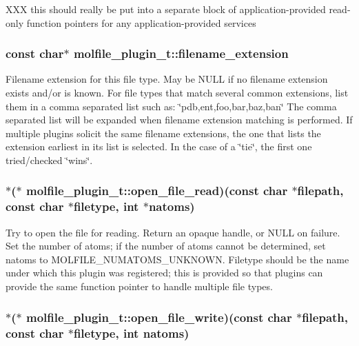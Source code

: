 \-X\-X\-X this should really be put into a separate block of application-\/provided read-\/only function pointers for any application-\/provided services \hypertarget{structmolfile__plugin__t_a707dd1b313dd9c8ec4f344038ef78708}{
\subsubsection[{filename\-\_\-extension}]{\setlength{\rightskip}{0pt plus 5cm}const char$\ast$ {\bf molfile\-\_\-plugin\-\_\-t\-::filename\-\_\-extension}}}\label{structmolfile__plugin__t_a707dd1b313dd9c8ec4f344038ef78708}
\-Filename extension for this file type. \-May be \-N\-U\-L\-L if no filename extension exists and/or is known. \-For file types that match several common extensions, list them in a comma separated list such as\-: \char`\"{}pdb,ent,foo,bar,baz,ban\char`\"{} \-The comma separated list will be expanded when filename extension matching is performed. \-If multiple plugins solicit the same filename extensions, the one that lists the extension earliest in its list is selected. \-In the case of a \char`\"{}tie\char`\"{}, the first one tried/checked \char`\"{}wins\char`\"{}. \hypertarget{structmolfile__plugin__t_a992bbcd14769aee84a652307eb864ce2}{
\subsubsection[{open\-\_\-file\-\_\-read}]{$\ast$($\ast$ {\bf molfile\-\_\-plugin\-\_\-t\-::open\-\_\-file\-\_\-read})(const char $\ast$filepath, const char $\ast$filetype, int $\ast$natoms)}}\label{structmolfile__plugin__t_a992bbcd14769aee84a652307eb864ce2}
\-Try to open the file for reading. \-Return an opaque handle, or \-N\-U\-L\-L on failure. \-Set the number of atoms; if the number of atoms cannot be determined, set natoms to \-M\-O\-L\-F\-I\-L\-E\-\_\-\-N\-U\-M\-A\-T\-O\-M\-S\-\_\-\-U\-N\-K\-N\-O\-W\-N. \-Filetype should be the name under which this plugin was registered; this is provided so that plugins can provide the same function pointer to handle multiple file types. \hypertarget{structmolfile__plugin__t_a01f35d1653fe51bce434f60d7a5b04d2}{
\subsubsection[{open\-\_\-file\-\_\-write}]{$\ast$($\ast$ {\bf molfile\-\_\-plugin\-\_\-t\-::open\-\_\-file\-\_\-write})(const char $\ast$filepath, const char $\ast$filetype, int natoms)}}\label{structmolfile__plugin__t_a01f35d1653fe51bce434f60d7a5b04d2}
